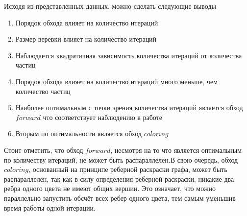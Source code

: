 	Исходя из представленных данных, можно сделать следующие выводы
	\begin{enumerate}[1.]
		\item Порядок обхода влияет на количество итераций
		\item Размер веревки влияет на количество итераций
		\item Наблюдается квадратичная зависимость количества итераций от количества частиц
		\item Порядок обхода влияет на количество итераций много меньше, чем количество частиц
		\item Наиболее оптимальным с точки зрения количества итераций является обход $forward$ что соответствует наблюдению в работе \cite{gu2017constraint}
		\item Вторым по оптимальности является обход $coloring$
	\end{enumerate}
	
	Стоит отметить, что обход $forward$, несмотря на то что является оптимальным по количеству итераций, не может быть распараллелен.В свою очередь, обход $coloring$, основанный на принципе реберной раскраски графа, может быть распараллелен, так как в силу определения реберной раскраски, никакие два ребра одного цвета не имеют общих вершин. Это означает, что можно параллельно запустить обсчёт всех ребер одного цвета, тем самым уменьшив время работы одной итерации. 

%

